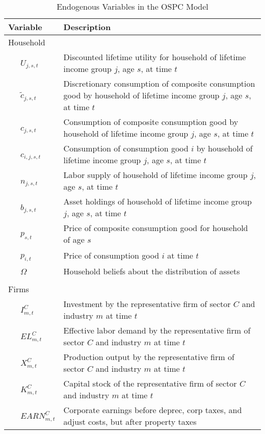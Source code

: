 \documentclass[letterpaper,12pt]{article}
\theoremstyle{definition}
\begin{document}
\begin{table}[h!]
  \centering
  \footnotesize
  \caption{Endogenous Variables in the OSPC Model}
    \begin{tabular}{ll}
    \hline
    \hline
    Variable & Description \\
    \hline
    Household &  \\
    \ \ \ $U_{j,s,t}$ & Discounted lifetime utility for household of lifetime income group $j$, age $s$, at time $t$ \\
     \ \ \ $\tilde{c}_{j,s,t}$ & Discretionary consumption of composite consumption good by household of lifetime income group $j$, age $s$, at time $t$ \\
    \ \ \ $c_{j,s,t}$ & Consumption of composite consumption good by household of lifetime income group $j$, age $s$, at time $t$ \\
    \ \ \ $c_{i,j,s,t}$ & Consumption of consumption good $i$ by household of lifetime income group $j$, age $s$, at time $t$ \\
    \ \ \ $n_{j,s,t}$ & Labor supply of household of lifetime income group $j$, age $s$, at time $t$ \\
    \ \ \ $b_{j,s,t}$ & Asset holdings of household of lifetime income group $j$, age $s$, at time $t$ \\
    \ \ \ $p_{s,t}$ & Price of composite consumption good for household of age $s$ \\
    \ \ \ $p_{i,t}$ & Price of consumption good $i$ at time $t$ \\
    \ \ \ $\Omega$ & Household beliefs about the distribution of assets \\
          &  \\
    Firms &  \\
    \ \ \ $I^{C}_{m,t}$ & Investment by the representative firm of sector $C$ and industry $m$ at time $t$ \\
    \ \ \ $EL^{C}_{m,t}$ & Effective labor demand by the representative firm of sector $C$ and industry $m$ at time $t$ \\
    \ \ \ $X^{C}_{m,t}$ & Production output by the representative firm of sector $C$ and industry $m$ at time $t$ \\
    \ \ \ $K^{C}_{m,t}$ & Capital stock of the representative firm of sector $C$ and industry $m$ at time $t$ \\
    \ \ \ $EARN^{C}_{m,t}$ & Corporate earnings before deprec, corp taxes, and adjust costs, but after property taxes \\

\end{tabular}
\end{table}
\end{document}
